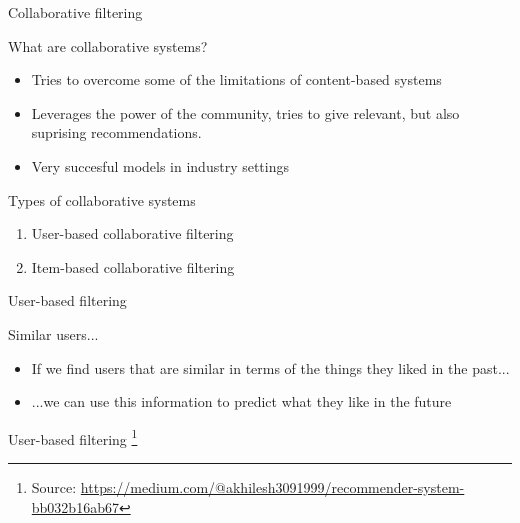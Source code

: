 \documentclass[handout]{beamer}
\begin{document}
\begin{frame}{Collaborative filtering}  
\begin{block}{What are collaborative systems?}
	\begin{itemize}
	\item <1-> Tries to overcome some of the limitations of content-based systems
	\item <2->Leverages the power of the community, tries to give relevant, but also suprising recommendations. 
	\item <3-> Very succesful models in industry settings
\end{itemize}
\end{block}
\begin{alertblock}{Types of collaborative systems}
	\begin{enumerate}
		\item User-based collaborative filtering
		\item Item-based collaborative filtering 
	\end{enumerate}
\end{alertblock}
\end{frame}

\begin{frame}{User-based filtering}  
	\begin{block}{Similar users...}
		\begin{itemize}
			\item<1->If we find users that are similar in terms of the things they liked in the past...
			\item<2->...we can use this information to predict what they like in the future
		\end{itemize}
	\end{block}
\end{frame}

\begin{frame}{User-based filtering}
	\footnote{Source: \url{https://medium.com/@akhilesh3091999/recommender-system-bb032b16ab67}}
\end{frame}
\end{document}
